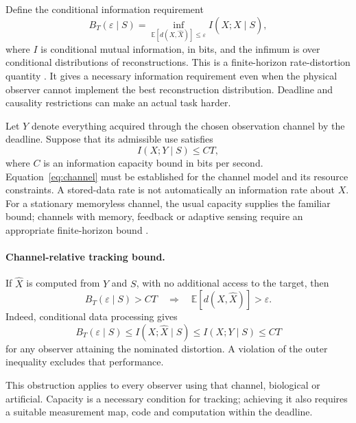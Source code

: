 \documentclass[11pt,a4paper]{article}
\begin{document}
Define the conditional information requirement
\begin{equation}
 B_T(\varepsilon\mid S)=
 \inf_{\mathbb{E}[d(X,\widehat X)]\leq\varepsilon}
 I(X;\widehat X\mid S),
 \label{eq:rd}
\end{equation}
where \(I\) is conditional mutual information, in bits, and the infimum is over conditional distributions of reconstructions. This is a finite-horizon rate-distortion quantity \citep{cover2006}. It gives a necessary information requirement even when the physical observer cannot implement the best reconstruction distribution. Deadline and causality restrictions can make an actual task harder.

Let \(Y\) denote everything acquired through the chosen observation channel by the deadline. Suppose that its admissible use satisfies
\begin{equation}
 I(X;Y\mid S)\leq CT,
 \label{eq:channel}
\end{equation}
where \(C\) is an information capacity bound in bits per second. Equation~\eqref{eq:channel} must be established for the channel model and its resource constraints. A stored-data rate is not automatically an information rate about \(X\). For a stationary memoryless channel, the usual capacity supplies the familiar bound; channels with memory, feedback or adaptive sensing require an appropriate finite-horizon bound \citep{shannon1948,cover2006}.

\paragraph{Channel-relative tracking bound.}
If \(\widehat X\) is computed from \(Y\) and \(S\), with no additional access to the target, then
\begin{equation}
 B_T(\varepsilon\mid S)>CT
 \quad\Longrightarrow\quad
 \mathbb{E}[d(X,\widehat X)]>\varepsilon.
 \label{eq:bound}
\end{equation}
Indeed, conditional data processing gives
\begin{equation}
 B_T(\varepsilon\mid S)
 \leq I(X;\widehat X\mid S)
 \leq I(X;Y\mid S)
 \leq CT
 \label{eq:proof}
\end{equation}
for any observer attaining the nominated distortion. A violation of the outer inequality excludes that performance.

This obstruction applies to every observer using that channel, biological or artificial. Capacity is a necessary condition for tracking; achieving it also requires a suitable measurement map, code and computation within the deadline.
\end{document}
